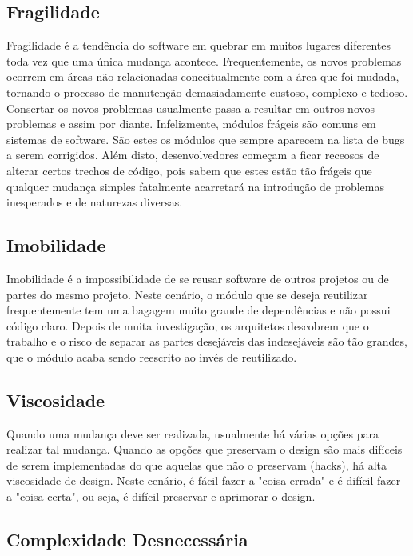\subsection{Fragilidade}
\label{subsec:fragilidade}

Fragilidade é a tendência do software em quebrar em muitos lugares diferentes toda vez que uma única mudança acontece. Frequentemente, os novos problemas ocorrem em áreas não relacionadas conceitualmente com a área que foi mudada, tornando o processo de manutenção demasiadamente custoso, complexo e tedioso. Consertar os novos problemas usualmente passa a resultar em outros novos problemas e assim por diante. Infelizmente, módulos frágeis são comuns em sistemas de software. São estes os módulos que sempre aparecem na lista de bugs a serem corrigidos. Além disto, desenvolvedores começam a ficar receosos de alterar certos trechos de código, pois sabem que estes estão tão frágeis que qualquer mudança simples fatalmente acarretará na introdução de problemas inesperados e de naturezas diversas. 


\subsection{Imobilidade}

Imobilidade é a impossibilidade de se reusar software de outros projetos ou de partes do mesmo projeto. Neste cenário, o módulo que se deseja reutilizar frequentemente tem uma bagagem muito grande de dependências e não possui código claro. Depois de muita investigação, os arquitetos descobrem que o trabalho e o risco de separar as partes desejáveis das indesejáveis são tão grandes, que o módulo acaba sendo reescrito ao invés de reutilizado.

\subsection{Viscosidade}

Quando uma mudança deve ser realizada, usualmente há várias opções para realizar tal mudança. Quando as opções que preservam o design são mais difíceis de serem implementadas do que aquelas que não o preservam (hacks), há alta viscosidade de design. Neste cenário, é fácil fazer a "coisa errada" e é difícil fazer a "coisa certa", ou seja, é difícil preservar e aprimorar o design.

\subsection{Complexidade Desnecessária}

